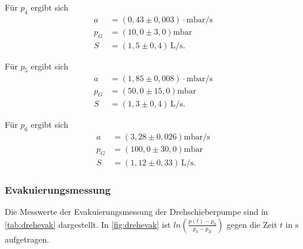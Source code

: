 Für $p_4$ ergibt sich
\begin{align*}
  a &= (0,43 \pm 0,003)\cdot \si{\milli\bar\per\second} \\
  p_G &= (10,0 \pm 3,0)  \si{\milli\bar} \\
  S &= (1,5 \pm 0,4)\,\si{\liter\per\second}.
\end{align*}

Für $p_5$ ergibt sich
\begin{align*}
  a &= (1,85 \pm 0,008)\cdot \si{\milli\bar\per\second} \\
  p_G &= (50,0 \pm 15,0)  \si{\milli\bar} \\
  S &= (1,3 \pm 0,4)\,\si{\liter\per\second}.
\end{align*}

Für $p_6$ ergibt sich
\begin{align*}
  a &= (3,28 \pm 0,026) \si{\milli\bar\per\second} \\
  p_G &= (100,0 \pm 30,0) \si{\milli\bar} \\
  S &= (1,12 \pm 0,33)\,\si{\liter\per\second}.
\end{align*}


\subsubsection{Evakuierungsmessung}
Die Messwerte der Evakuierungsmessung der Drehschieberpumpe sind in \autoref{tab:drehevak} dargestellt. In
\autoref{fig:drehevak} ist $ln(\frac{p(t)-p_0}{p_0 - p_E})$ gegen die Zeit $t$ in $\si{\second}$ aufgetragen.


